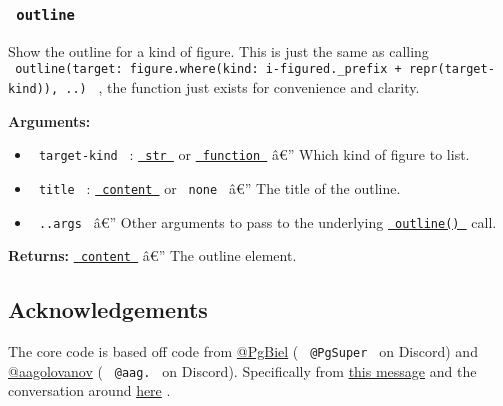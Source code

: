\subsubsection{\texorpdfstring{\texttt{\ outline\ }}{ outline }}\label{outline}

Show the outline for a kind of figure. This is just the same as calling
\texttt{\ outline(target:\ figure.where(kind:\ i-figured.\_prefix\ +\ repr(target-kind)),\ ..)\ }
, the function just exists for convenience and clarity.

\begin{Shaded}
\begin{Highlighting}[]
\end{Highlighting}
\end{Shaded}

\textbf{Arguments:}

\begin{itemize}
\tightlist
\item
  \texttt{\ target-kind\ } :
  \href{https://typst.app/docs/reference/foundations/str/}{\texttt{\ str\ }}
  or
  \href{https://typst.app/docs/reference/foundations/function/}{\texttt{\ function\ }}
  â€'' Which kind of figure to list.
\item
  \texttt{\ title\ } :
  \href{https://typst.app/docs/reference/foundations/content/}{\texttt{\ content\ }}
  or \texttt{\ none\ } â€'' The title of the outline.
\item
  \texttt{\ ..args\ } â€'' Other arguments to pass to the underlying
  \href{https://typst.app/docs/reference/meta/outline/}{\texttt{\ outline()\ }}
  call.
\end{itemize}

\textbf{Returns:}
\href{https://typst.app/docs/reference/foundations/content/}{\texttt{\ content\ }}
â€'' The outline element.

\subsection{Acknowledgements}\label{acknowledgements}

The core code is based off code from
\href{https://github.com/PgBiel}{@PgBiel} ( \texttt{\ @PgSuper\ } on
Discord) and \href{https://github.com/aagolovanov}{@aagolovanov} (
\texttt{\ @aag.\ } on Discord). Specifically from
\href{https://discord.com/channels/1054443721975922748/1088371919725793360/1158534418760224809}{this
message} and the conversation around
\href{https://discord.com/channels/1054443721975922748/1088371919725793360/1159172567282749561}{here}
.

